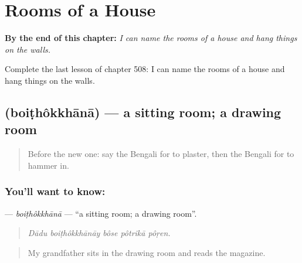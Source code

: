 
\chapter{Rooms of a House}
\label{ch:bn-rooms-of-a-house}

\begin{chapteropening}
\textbf{By the end of this chapter:} \emph{I can name the rooms of a house and hang things on the walls.}

Complete the last lesson of chapter 508: I can name the rooms of a house and hang things on the walls.
\end{chapteropening}

\section[\texorpdfstring{\bn{বৈঠকখানা} (boiṭhôkkhānā)}{বৈঠকখানা (boiṭhôkkhānā)}]{ (boiṭhôkkhānā) — a sitting room; a drawing room}

\label{lesson:BN-C508-boithokkhana}



\begin{quote}
Before the new one: say the Bengali for to plaster, then the Bengali for to hammer in.
\end{quote}

\subsection*{You'll want to know: }
\textbf{} — \emph{boiṭhôkkhānā} — \textquotedblleft{}a sitting room; a drawing room\textquotedblright{}.

\begin{quote}
    
\end{quote}

\begin{quote}
\emph{Dādu boiṭhôkkhānāy bôse pôtrikā pôṛen.}
\end{quote}

\begin{quote}
My grandfather sits in the drawing room and reads the magazine.
\end{quote}

